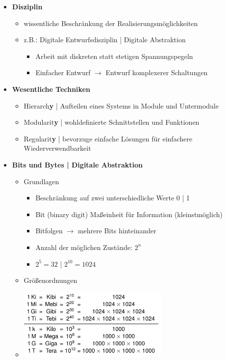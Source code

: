 \documentclass[11pt,a4paper]{article}
\begin{document}
\begin{itemize}
\vspace{0.4cm}

\item \textbf{Disziplin}
	\begin{itemize}
	\item wissentliche Beschränkung der Realisierungsmöglichkeiten
	\item z.B.: Digitale Entwurfsdisziplin | Digitale Abstraktion 
		\begin{itemize}
		\item Arbeit mit diskreten statt stetigen Spannungspegeln
		\item Einfacher Entwurf $\rightarrow$ Entwurf komplexerer Schaltungen
		\end{itemize}
	\end{itemize}

\item \textbf{Wesentliche Techniken}
	\begin{itemize}
	\item Hierarch\textbf{y} | Aufteilen eines Systems in Module und Untermodule
	\item Modularit\textbf{y} | wohldefinierte Schnittstellen und Funktionen
	\item Regularit\textbf{y} | bevorzuge einfache Lösungen für einfachere Wiederverwendbarkeit
	\end{itemize} 

\item \textbf{Bits und Bytes | Digitale Abstraktion}
	\begin{itemize}
	\item Grundlagen 
		\begin{itemize}
		\item Beschränkung auf zwei unterschiedliche Werte 0 | 1
		\item Bit (binary digit) Maßeinheit für Information (kleinstmöglich)
		\item Bitfolgen $\rightarrow$ mehrere Bits hinteinander
		\item Anzahl der möglichen Zustände: $2^n$
		\item $2^5 = 32$ | $2^{10} = 1024$
		\end{itemize}		 
	
	\item Größenordnungen
	\item[] %
				\includegraphics[height=3.5cm]{groessenordnung}
		

\end{itemize}
\end{itemize}
\end{document}
